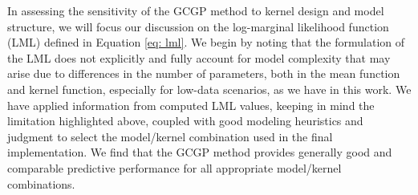 \documentclass[journal=jacsat,manuscript=article, ]{achemso}
\begin{document}
In assessing the sensitivity of the GCGP method to kernel design and model structure, we will focus our discussion on the log-marginal likelihood function (LML) defined in Equation \ref{eq: lml}. 
We begin by noting that the formulation of the LML does not explicitly and fully account for model complexity that may arise due to differences in the number of parameters, both in the mean function and kernel function, especially for low-data scenarios, as we have in this work. 
We have applied information from computed LML values, keeping in mind the limitation highlighted above, coupled with good modeling heuristics and judgment to select the model/kernel combination used in the final implementation. 
We find that the GCGP method provides generally good and comparable predictive performance for all appropriate model/kernel combinations. 
\end{document}
